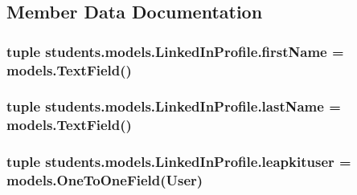 \subsection{Member Data Documentation}
\hypertarget{classstudents_1_1models_1_1_linked_in_profile_a8fedcda58ba560b252b16404f83feb5e}{
\subsubsection[{first\-Name}]{\setlength{\rightskip}{0pt plus 5cm}tuple students.\-models.\-Linked\-In\-Profile.\-first\-Name = models.\-Text\-Field()\hspace{0.3cm}{\ttfamily [static]}}}\label{classstudents_1_1models_1_1_linked_in_profile_a8fedcda58ba560b252b16404f83feb5e}
\hypertarget{classstudents_1_1models_1_1_linked_in_profile_ad8ce210760752fd163191757482008bc}{
\subsubsection[{last\-Name}]{\setlength{\rightskip}{0pt plus 5cm}tuple students.\-models.\-Linked\-In\-Profile.\-last\-Name = models.\-Text\-Field()\hspace{0.3cm}{\ttfamily [static]}}}\label{classstudents_1_1models_1_1_linked_in_profile_ad8ce210760752fd163191757482008bc}
\hypertarget{classstudents_1_1models_1_1_linked_in_profile_ac0b6bb95d0354a37b69a74c261ee67cb}{
\subsubsection[{leapkituser}]{\setlength{\rightskip}{0pt plus 5cm}tuple students.\-models.\-Linked\-In\-Profile.\-leapkituser = models.\-One\-To\-One\-Field(User)\hspace{0.3cm}{\ttfamily [static]}}}\label{classstudents_1_1models_1_1_linked_in_profile_ac0b6bb95d0354a37b69a74c261ee67cb}
